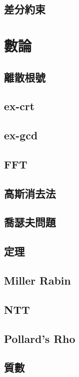 \documentclass[a4paper,10pt,twocolumn,oneside]{article}
\begin{document}
\subsection{差分約束}

\section{數論}
\subsection{離散根號}

\subsection{ex-crt}

\subsection{ex-gcd}

\subsection{FFT}

\subsection{高斯消去法}

\subsection{喬瑟夫問題}

\subsection{定理}

\subsection{Miller Rabin}

\subsection{NTT}

\subsection{Pollard's Rho}

\subsection{質數}

\end{document}
